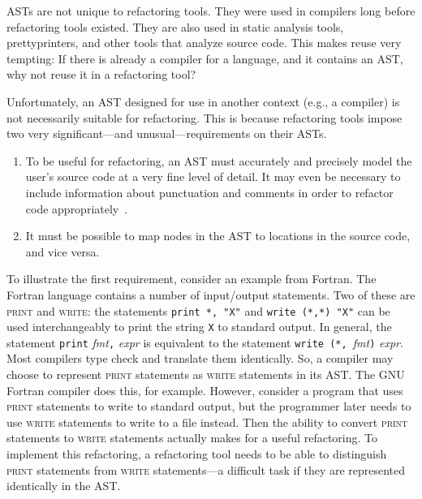 \documentclass[prodmode]{acmlarge}
\newcommand{\ttt}[1]{\texttt{#1}}
\begin{document}

ASTs are not unique to refactoring tools.  They were used in compilers long
before refactoring tools existed.  They are also used in static analysis tools,
prettyprinters, and other tools that analyze source code.  This makes reuse
very tempting: If there is already a compiler for a language, and it contains
an AST, why not reuse it in a refactoring tool?

Unfortunately, an AST designed for use in another context (e.g., a compiler) is
not necessarily suitable for refactoring.  This is because refactoring tools
impose two very significant---and unusual---requirements on their ASTs.

\begin{enumerate}
\item To be useful for refactoring, an AST must accurately and precisely model
the user's source code at a very fine level of detail.  It may even be
necessary to include information about punctuation and comments in order to
refactor code appropriately~\cite{sommerlad08retaining}.
\item It must be possible to map nodes in the AST to locations in the
source code, and vice versa.
\end{enumerate}

To illustrate the first requirement, consider an example from Fortran.  The
Fortran language contains a number of input/output statements.  Two of these
are \textsc{print} and \textsc{write}: the statements \ttt{print *, "X"} and
\ttt{write (*,*) "X"} can be used interchangeably to print the string \ttt{X}
to standard output.  In general, the statement \ttt{print} \textit{fmt}\ttt{,}
\textit{expr} is equivalent to the statement \ttt{write (*,
}\textit{fmt}\ttt{)} \textit{expr}.  Most compilers type check and translate
them identically.  So, a compiler may choose to represent \textsc{print}
statements as \textsc{write} statements in its AST.  The GNU Fortran compiler
does this, for example.  However, consider a program that uses \textsc{print} 
statements to write to standard output, but the programmer later needs to 
use \textsc{write}
statements to write to a file instead. Then the ability to convert \textsc{print}
statements to \textsc{write} statements actually makes for a useful
refactoring. To implement this refactoring, a
refactoring tool needs to be able to distinguish \textsc{print} statements from
\textsc{write} statements---a difficult task if they are represented
identically in the AST.
\end{document}
